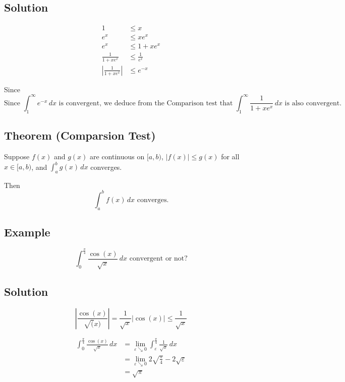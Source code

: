 \documentclass[11pt]{article}
\begin{document}
\subsection*{Solution}
\begin{align*}
1 &\leq x \\
e^x &\leq xe^x \\
e^x &\leq 1 + xe^x \\
\frac{1}{1 + xe^x} &\leq \frac{1}{e^x} \\
\left| \frac{1}{1 + xe^x} \right| &\leq e^{-x}
\end{align*}

Since
\[ \text{Since } \int_1^\infty e^{-x} \,dx \text{ is convergent, we deduce from the Comparison test that } \int_1^\infty \frac{1}{1 + xe^x} \,dx \text{ is also convergent.}\]

\subsection*{Theorem (Comparsion Test)}
Suppose $f(x)$ and $g(x)$ are continuous on $[a, b)$, $|f(x)| \leq g(x) $ for all $ x\in[a,b) $, and $\int_a^b g(x) \,dx$ converges.

Then 
\[ \int_a^b f(x) \,dx \text{ converges.}\]

\subsection*{Example}
\[ \int_0^\frac{\pi}{4} \frac{\cos(x)}{\sqrt{x}} \,dx \text{ convergent or not?} \]

\subsection*{Solution}
\[ 
\left| \frac{\cos(x)}{\sqrt(x)} \right| = \frac{1}{\sqrt{x}} |\cos(x)| \leq \frac{1}{\sqrt{x}}
\]

\begin{align*}
\int_0^\frac{\pi}{4} \frac{\cos(x)}{\sqrt{x}} \,dx &= \lim_{\varepsilon\searrow 0} \int_\varepsilon^\frac{\pi}{4}  \frac{1}{\sqrt{x}} \,dx \\
 &= \lim_{\varepsilon\searrow 0} 2\sqrt{\frac{\pi}{4}} - 2\sqrt{\varepsilon} \\
 &= \sqrt{\pi}
\end{align*}
\end{document}
